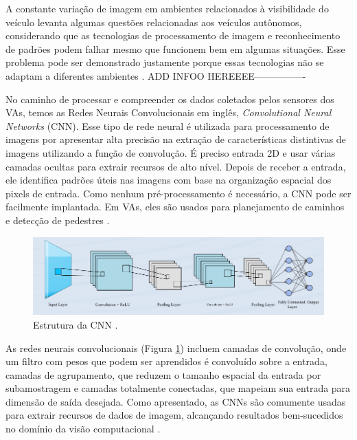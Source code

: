 A constante variação de imagem em ambientes relacionados à visibilidade do veículo levanta algumas questões relacionadas aos veículos autônomos, considerando que as tecnologias de processamento de imagem e reconhecimento de padrões podem falhar mesmo que funcionem bem em algumas situações. Esse problema pode ser demonstrado justamente porque essas tecnologias não se adaptam a diferentes ambientes \cite{caio}.
ADD INFOO HEREEEE----------------


No caminho de processar e compreender os dados coletados pelos sensores dos VAs, temos as Redes Neurais Convolucionais em inglês, \textit{Convolutional Neural Networks} (CNN). Esse tipo de rede neural é utilizada para processamento de imagens por apresentar alta precisão na extração de características distintivas de imagens utilizando a função de convolução. É preciso entrada 2D e usar várias camadas ocultas para extrair recursos de alto nível. Depois de receber a entrada, ele identifica padrões úteis nas imagens com base na organização espacial dos pixels de entrada. Como nenhum pré-processamento é necessário, a CNN pode ser facilmente implantada. Em VAs, eles são usados para planejamento de caminhos e detecção de pedestres \cite{review-auto}.

\begin{figure}[H]
\centering
\includegraphics[width=\textwidth]{Figures/CNN.png}
\caption{Estrutura da CNN \cite{software-cnn}.}
\label{CNN}
\end{figure}

As redes neurais convolucionais (Figura \ref{CNN}) incluem camadas de convolução, onde um filtro com pesos que podem ser aprendidos é convoluído sobre a entrada, camadas de agrupamento, que reduzem o tamanho espacial da entrada por subamostragem e camadas totalmente conectadas, que mapeiam sua entrada para dimensão de saída desejada. Como apresentado, as CNNs são comumente usadas para extrair recursos de dados de imagem, alcançando resultados bem-sucedidos no domínio da visão computacional \cite{software-review}.


